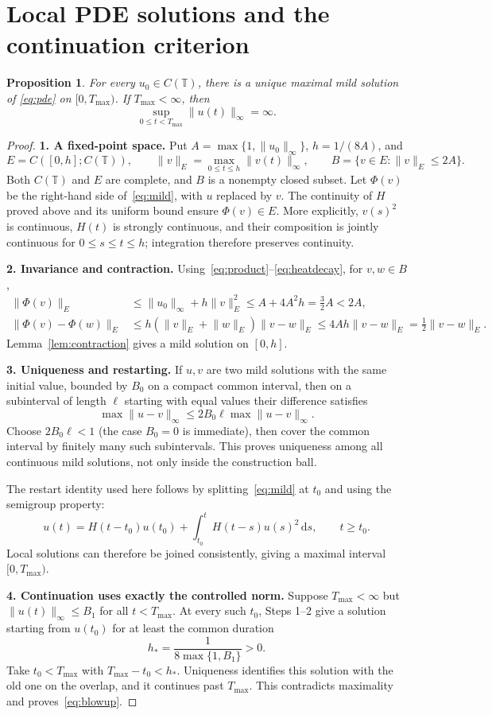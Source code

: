 \documentclass[a4paper,10pt]{article}
\numberwithin{equation}{section}
\newtheorem{proposition}[theorem]{Proposition}
\theoremstyle{definition}
\theoremstyle{remark}
\newcommand{\T}{\mathbb T}
\newcommand{\norm}[1]{\lVert#1\rVert}
\newcommand{\dd}{\,\mathrm d}
\newcommand{\Tmax}{T_{\max}}
\newcommand{\pageheading}[1]{\section{#1}}
\begin{document}
\newpage
\pageheading{Local PDE solutions and the continuation criterion}
\begin{proposition}\label{prop:local}
For every $u_0\in C(\T)$, there is a unique maximal mild solution of
\eqref{eq:pde} on $[0,\Tmax)$. If $\Tmax<\infty$, then
\begin{equation}\label{eq:blowup}
\sup_{0\leq t<\Tmax}\norm{u(t)}_\infty=\infty.
\end{equation}
\end{proposition}
\begin{proof}
\textbf{1. A fixed-point space.}
Put $A=\max\{1,\norm{u_0}_\infty\}$, $h=1/(8A)$, and
\[
E=C([0,h];C(\T)),\qquad
\norm v_E=\max_{0\leq t\leq h}\norm{v(t)}_\infty,\qquad
B=\{v\in E:\norm v_E\leq2A\}.
\]
Both $C(\T)$ and $E$ are complete, and $B$ is a nonempty closed subset.
Let $\Phi(v)$ be the right-hand side of~\eqref{eq:mild}, with $u$ replaced
by $v$. The continuity of $H$ proved above and its uniform bound ensure
$\Phi(v)\in E$. More explicitly, $v(s)^2$ is continuous, $H(t)$ is
strongly continuous, and their composition is jointly continuous for
$0\leq s\leq t\leq h$; integration therefore preserves continuity.

\textbf{2. Invariance and contraction.}
Using~\eqref{eq:product}--\eqref{eq:heatdecay}, for $v,w\in B$,
\begin{align*}
\norm{\Phi(v)}_E
&\leq\norm{u_0}_\infty+h\norm v_E^2
 \leq A+4A^2h=\tfrac32A<2A,\\
\norm{\Phi(v)-\Phi(w)}_E
&\leq h(\norm v_E+\norm w_E)\norm{v-w}_E
 \leq4Ah\norm{v-w}_E=\tfrac12\norm{v-w}_E.
\end{align*}
Lemma~\ref{lem:contraction} gives a mild solution on $[0,h]$.

\textbf{3. Uniqueness and restarting.}
If $u,v$ are two mild solutions with the same initial value, bounded by
$B_0$ on a compact common interval, then on a subinterval of length $\ell$
starting with equal values their difference satisfies
\[
\max\norm{u-v}_\infty\leq2B_0\ell\max\norm{u-v}_\infty.
\]
Choose $2B_0\ell<1$ (the case $B_0=0$ is immediate), then cover the
common interval by finitely many such subintervals. This proves uniqueness
among all continuous mild solutions, not only inside the construction ball.

The restart identity used here follows by splitting~\eqref{eq:mild} at
$t_0$ and using the semigroup property:
\begin{equation}\label{eq:restart}
u(t)=H(t-t_0)u(t_0)+\int_{t_0}^t H(t-s)u(s)^2\dd s,
\qquad t\geq t_0.
\end{equation}
Local solutions can therefore be joined consistently, giving a maximal
interval $[0,\Tmax)$.

\textbf{4. Continuation uses exactly the controlled norm.}
Suppose $\Tmax<\infty$ but $\norm{u(t)}_\infty\leq B_1$ for all
$t<\Tmax$. At every such $t_0$, Steps 1--2 give a solution starting from
$u(t_0)$ for at least the common duration
\[
h_* =\frac{1}{8\max\{1,B_1\}}>0.
\]
Take $t_0<\Tmax$ with $\Tmax-t_0<h_*$. Uniqueness identifies this
solution with the old one on the overlap, and it continues past $\Tmax$.
This contradicts maximality and proves~\eqref{eq:blowup}.
\end{proof}
\end{document}
